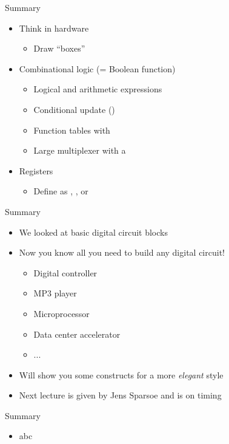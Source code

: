 \begin{frame}[fragile]{Summary}
\begin{itemize}
\item Think in hardware
\begin{itemize}
\item Draw ``boxes''
\end{itemize}
\item Combinational logic (= Boolean function)
\begin{itemize}
\item Logical and arithmetic expressions
\item Conditional update ()
\item Function tables with 
\item Large multiplexer with a 
\end{itemize}
\item Registers
\begin{itemize}
\item Define as , , or 
\end{itemize}
\end{itemize}
\end{frame}

\begin{frame}[fragile]{Summary}
\begin{itemize}
\item We looked at basic digital circuit blocks
\item Now you know all you need to build any digital circuit!
\begin{itemize}
\item Digital controller
\item MP3 player
\item Microprocessor
\item Data center accelerator
\item ...
\end{itemize}
\item Will show you some constructs for a more \emph{elegant} style
\item Next lecture is given by Jens Sparsoe and is on timing
\end{itemize}
\end{frame}




\begin{frame}[fragile]{Summary}
\begin{itemize}
\item abc
\end{itemize}
\end{frame}
